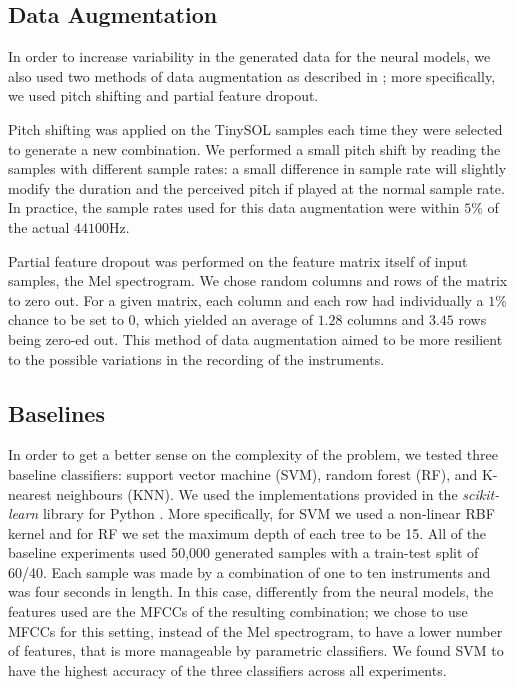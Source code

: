 \documentclass[runningheads,a4paper]{llncs}
\begin{document}
\subsection{Data Augmentation}

In order to increase variability in the generated data for the neural models, we also used two methods of data augmentation as described in \cite{Salamon17, Bhardwaj17}; more specifically, we used pitch shifting and partial feature dropout.

Pitch shifting was applied on the TinySOL samples each time they were selected to generate a new combination. We performed a small pitch shift by reading the samples with different sample rates: a small difference in sample rate will slightly modify the duration and the perceived pitch if played at the normal sample rate. In practice, the sample rates used for this data augmentation were within $5\%$ of the actual $44100$Hz.

Partial feature dropout was performed on the feature matrix itself of input samples, the Mel spectrogram. We chose random columns and rows of the matrix to zero out. For a given matrix, each column and each row had individually a $1\%$ chance to be set to 0, which yielded an average of $1.28$  columns and $3.45$ rows being zero-ed out. This method of data augmentation aimed to be more resilient to the possible variations in the recording of the instruments.

\subsection{Baselines}
\label{sec:baseline}

In order to get a better sense on the complexity of the problem, we tested three baseline classifiers: support vector machine (SVM), random forest (RF), and K-nearest neighbours (KNN). We used the implementations provided in the \emph{scikit-learn }library for Python \cite{scikit-learn}. More specifically, for SVM we used a non-linear RBF kernel and for RF we set the maximum depth of each tree to be 15.  All of the baseline experiments used 50,000 generated samples with a train-test split of 60/40. Each sample was made by a combination of one to ten instruments and was four seconds in length.
In this case, differently from the neural models, the features used are the MFCCs of the resulting combination; we chose to use MFCCs for this setting, instead of the Mel spectrogram, to have a lower number of features, that is more manageable by parametric classifiers. We found SVM to have the highest accuracy of the three classifiers across all experiments.
\end{document}
